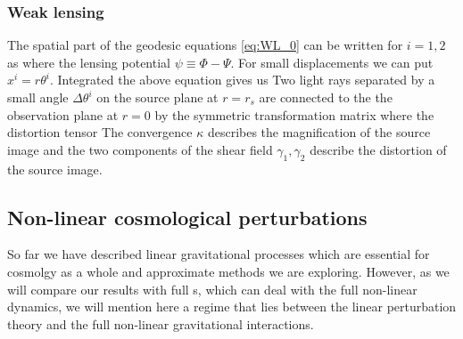 \subsubsection{Weak lensing}
The spatial part of the geodesic equations \eqref{eq:WL_0} can be written for $i=1,2$ as
where the lensing potential $\psi\equiv\Phi-\Psi$. For small displacements we can put $x^i=r\theta^i$. Integrated the above equation gives us
Two light rays separated by a small angle  $\Delta\theta^i$ on the source plane at $r=r_s$ are connected to the the observation plane at $r=0$ by the symmetric transformation matrix
where the distortion tensor
The convergence $\kappa$ describes the magnification of the source image and the two components of the shear field $\gamma_1,\gamma_2$ describe the distortion of the source image.
\subsection{Non-linear cosmological perturbations}
So far we have described linear gravitational processes which are essential for cosmolgy as a whole and approximate methods we are exploring. However, as we will compare our results with full \nbodysim s, which can deal with the full non-linear dynamics, we will mention here a regime that lies between the linear perturbation theory and the full non-linear gravitational interactions.


